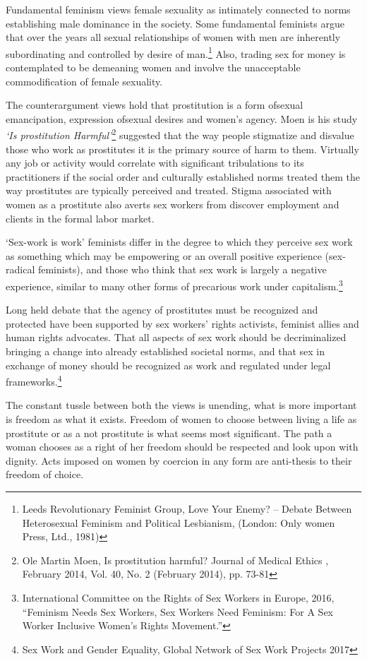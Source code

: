\begin{multicols}{2}
\noi
Fundamental feminism views female sexuality as intimately connected to norms establishing
male dominance in the society. Some fundamental feminists argue that over the years all sexual
relationships of women with men are inherently subordinating and controlled by desire of
man.\footnote{Leeds Revolutionary Feminist Group, Love Your Enemy? – Debate Between Heterosexual Feminism and Political Lesbianism, (London: Only women Press, Ltd., 1981)} Also, trading sex for money is contemplated to be demeaning women and involve the unacceptable commodification of female sexuality.

\noi
The counterargument views hold that prostitution is a form ofsexual emancipation, expression
ofsexual desires and women’s agency. Moen is his study \textit{‘Is prostitution Harmful’}\footnote{ Ole Martin Moen, Is prostitution harmful? Journal of Medical Ethics , February 2014, Vol. 40, No. 2 (February 2014), pp. 73-81} suggested
that the way people stigmatize and disvalue those who work as prostitutes it is the primary
source of harm to them. Virtually any job or activity would correlate with significant
tribulations to its practitioners if the social order and culturally established norms treated them
the way prostitutes are typically perceived and treated. Stigma associated with women as a prostitute also averts sex workers from discover employment and clients in the formal labor market.

\noi
‘Sex-work is work’ feminists differ in the degree to which they perceive sex work as something
which may be empowering or an overall positive experience (sex-radical feminists), and those
who think that sex work is largely a negative experience, similar to many other forms of
precarious work under capitalism.\footnote{International Committee on the Rights of Sex Workers in Europe, 2016, “Feminism Needs Sex Workers, Sex Workers Need Feminism: For A Sex Worker Inclusive Women’s Rights Movement.”}

\noi
Long held debate that the agency of prostitutes must be recognized and protected have been
supported by sex workers’ rights activists, feminist allies and human rights advocates. That all
aspects of sex work should be decriminalized bringing a change into already established
societal norms, and that sex in exchange of money should be recognized as work and regulated
under legal frameworks.\footnote{Sex Work and Gender Equality, Global Network of Sex Work Projects 2017}

\noi
The constant tussle between both the views is unending, what is more important is freedom as
what it exists. Freedom of women to choose between living a life as prostitute or as a not
prostitute is what seems most significant. The path a woman chooses as a right of her freedom
should be respected and look upon with dignity. Acts imposed on women by coercion in any
form are anti-thesis to their freedom of choice.


\end{multicols}
